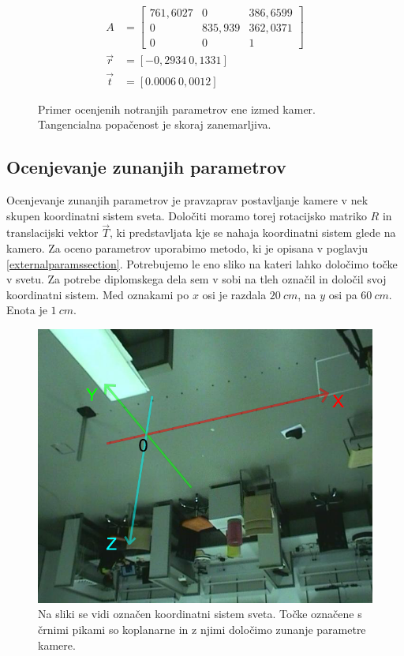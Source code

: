 \documentclass[a4paper, 12pt]{book}
\begin{document}
\begin{figure}[H]
\begin{align}
A &= 
\begin{bmatrix}
761,6027 & 0 & 386,6599 \\
0 & 835,939 & 362,0371 \\
0 & 0 & 1
\end{bmatrix} \\
\vec{r} &= [-0,2934 \ 0,1331] \\
\vec{t} &= [0.0006 \ 0,0012]
\end{align}
\caption{Primer ocenjenih notranjih parametrov ene izmed kamer. Tangencialna popačenost je skoraj zanemarljiva.}
\end{figure}


\subsection{Ocenjevanje zunanjih parametrov}
Ocenjevanje zunanjih parametrov je pravzaprav postavljanje kamere v nek skupen koordinatni sistem sveta. Določiti moramo torej rotacijsko matriko $R$ in translacijski vektor $\vec{T}$, ki predstavljata kje se nahaja koordinatni sistem glede na kamero. Za oceno parametrov uporabimo metodo, ki je opisana v poglavju \ref{externalparamssection}. Potrebujemo le eno sliko na kateri lahko določimo točke v svetu. Za potrebe diplomskega dela sem v sobi na tleh označil in določil svoj koordinatni sistem. Med oznakami po $x$ osi je razdala $20 \ cm$, na $y$ osi pa $60 \ cm$. Enota je $1 \ cm$.

\begin{figure}[H]
\centering
\includegraphics[width=\textwidth,height=\textheight,keepaspectratio]{coord_system.png}
\caption{Na sliki se vidi označen koordinatni sistem sveta. Točke označene s črnimi pikami so koplanarne in z njimi določimo zunanje parametre kamere.}
\label{coordsystemimg}
\end{figure}
\end{document}
